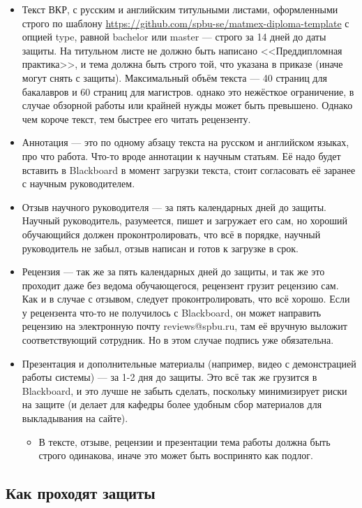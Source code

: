 \documentclass{article}
\begin{document}
\begin{itemize}
    \item Текст ВКР, с русским и английским титульными листами, оформленными строго по шаблону \url{https://github.com/spbu-se/matmex-diploma-template} с опцией type, равной bachelor или master --- строго за 14 дней до даты защиты. На титульном листе не должно быть написано <<Преддипломная практика>>, и тема должна быть строго той, что указана в приказе (иначе могут снять с защиты). Максимальный объём текста --- 40 страниц для бакалавров и 60 страниц для магистров. однако это нежёсткое ограничение, в случае обзорной работы или крайней нужды может быть превышено. Однако чем короче текст, тем быстрее его читать рецензенту.  
    \item Аннотация --- это по одному абзацу текста на русском и английском языках, про что работа. Что-то вроде аннотации к научным статьям. Её надо будет вставить в Blackboard в момент загрузки текста, стоит согласовать её заранее с научным руководителем.
    \item Отзыв научного руководителя --- за пять календарных дней до защиты. Научный руководитель, разумеется, пишет и загружает его сам, но хороший обучающийся должен проконтролировать, что всё в порядке, научный руководитель не забыл, отзыв написан и готов к загрузке в срок.
    \item Рецензия --- так же за пять календарных дней до защиты, и так же это проходит даже без ведома обучающегося, рецензент грузит рецензию сам. Как и в случае с отзывом, следует проконтролировать, что всё хорошо. Если у рецензента что-то не получилось с Blackboard, он может направить рецензию на электронную почту reviews@spbu.ru, там её вручную выложит соответствующий сотрудник. Но в этом случае подпись уже обязательна.
    \item Презентация и дополнительные материалы (например, видео с демонстрацией работы системы) --- за 1-2 дня до защиты. Это всё так же грузится в Blackboard, и это лучше не забыть сделать, поскольку минимизирует риски на защите (и делает для кафедры более удобным сбор материалов для выкладывания на сайте).
    \begin{itemize}
        \item В тексте, отзыве, рецензии и презентации тема работы должна быть строго одинакова, иначе это может быть воспринято как подлог.
    \end{itemize}
\end{itemize}

\subsection{Как проходят защиты}
\end{document}
